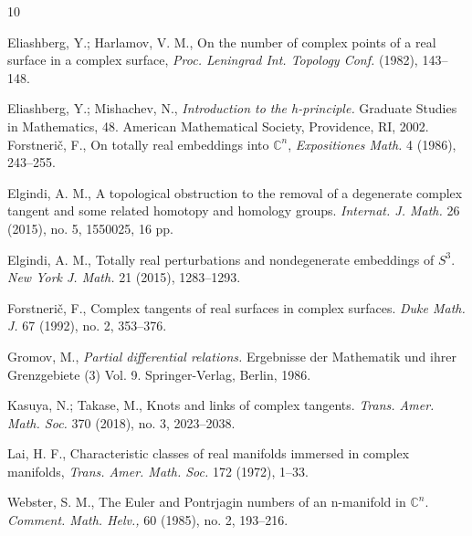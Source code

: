 \documentclass[12pt]{amsart}
\theoremstyle{definition}
\newcommand{\C}{\mathbb{C}}
\numberwithin{equation}{section}
\begin{document}

\begin{thebibliography}{10}
\def\same{{-----------\ }}


 Eliashberg, Y.; Harlamov, V. M., On the number of complex points of a real surface in a
complex surface, \textit{Proc. Leningrad Int. Topology Conf.}
(1982), 143--148.

Eliashberg, Y.; Mishachev, N.,
\textit{Introduction to the h-principle.} Graduate Studies in Mathematics, 48. American Mathematical Society, Providence, RI, 2002.
 Forstneri\v{c}, F.,
{On totally real embeddings into $\mathbb C^n$},
\textit{Expositiones Math.} {4} (1986), 243--255.

 Elgindi, A. M.,
A topological obstruction to the removal of a degenerate complex tangent and some related homotopy and homology groups. \textit{Internat. J. Math.} {26} (2015), no. 5, 1550025, 16 pp.

 Elgindi, A. M., Totally real perturbations and nondegenerate embeddings of $S^3$.
\textit{New York J. Math.} {21} (2015), 1283--1293.

 Forstneri\v{c}, F.,
 Complex tangents of real surfaces in complex surfaces. 
\textit{Duke Math. J.} 67 (1992), no. 2, 353--376.
		
 Gromov, M., \textit{Partial differential relations.} Ergebnisse der Mathematik und ihrer Grenzgebiete (3) Vol. 9. Springer-Verlag, Berlin, 1986.		

 Kasuya, N.;  Takase, M., Knots and links of complex tangents.  \textit{Trans. Amer. Math. Soc.} 370 (2018), no. 3, 2023--2038.

Lai, H. F., Characteristic classes of real manifolds immersed in
complex manifolds, 
\textit{Trans. Amer. Math. Soc.} {172} (1972), 1--33.

 Webster, S. M., The Euler and Pontrjagin numbers of an n-manifold in $\C^n$. \textit{Comment. Math. Helv.,} 60 (1985), no. 2, 193--216.
\end{thebibliography}
\end{document}
